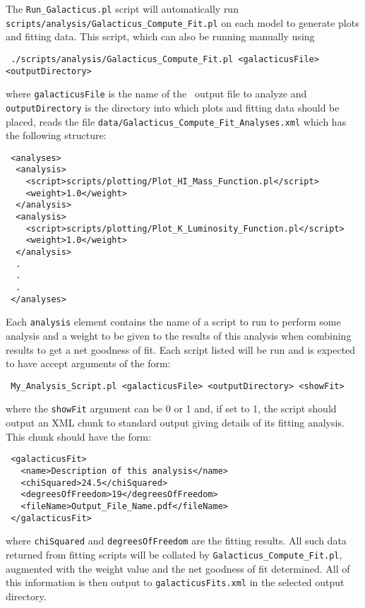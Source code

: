 The {\tt Run\_Galacticus.pl} script will automatically run {\tt scripts/analysis/Galacticus\_Compute\_Fit.pl} on each model to generate plots and fitting data. This script, which can also be running manually using
\begin{verbatim}
 ./scripts/analysis/Galacticus_Compute_Fit.pl <galacticusFile> <outputDirectory>
\end{verbatim}
where {\tt galacticusFile} is the name of the \glc\ output file to analyze and {\tt outputDirectory} is the directory into which plots and fitting data should be placed, reads the file {\tt data/Galacticus\_Compute\_Fit\_Analyses.xml} which has the following structure:
\begin{verbatim}
 <analyses>
  <analysis>
    <script>scripts/plotting/Plot_HI_Mass_Function.pl</script>
    <weight>1.0</weight>
  </analysis>
  <analysis>
    <script>scripts/plotting/Plot_K_Luminosity_Function.pl</script>
    <weight>1.0</weight>
  </analysis>
  .
  .
  .
 </analyses>
\end{verbatim}
Each {\tt analysis} element contains the name of a script to run to perform some analysis and a weight to be given to the results of this analysis when combining results to get a net goodness of fit. Each script listed will be run and is expected to have accept arguments of the form:
\begin{verbatim}
 My_Analysis_Script.pl <galacticusFile> <outputDirectory> <showFit>
\end{verbatim}
where the {\tt showFit} argument can be 0 or 1 and, if set to 1, the script should output an XML chunk to standard output giving details of its fitting analysis. This chunk should have the form:
\begin{verbatim}
 <galacticusFit>
   <name>Description of this analysis</name>
   <chiSquared>24.5</chiSquared>
   <degreesOfFreedom>19</degreesOfFreedom>
   <fileName>Output_File_Name.pdf</fileName>
 </galacticusFit>
\end{verbatim}
where {\tt chiSquared} and {\tt degreesOfFreedom} are the fitting results. All such data returned from fitting scripts will be collated by {\tt Galacticus\_Compute\_Fit.pl}, augmented with the weight value and the net goodness of fit determined. All of this information is then output to {\tt galacticusFits.xml} in the selected output directory.

